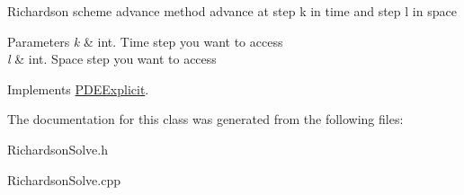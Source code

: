 Richardson scheme advance method advance at step k in time and step l in space 
\begin{DoxyParams}{Parameters}
{\em k} & int. Time step you want to access \\
\hline
{\em l} & int. Space step you want to access \\
\hline
\end{DoxyParams}


Implements \hyperlink{class_p_d_e_explicit_aed238f52510878474c02681904013dd3}{P\+D\+E\+Explicit}.



The documentation for this class was generated from the following files\+:\begin{DoxyCompactItemize}
\item 
Richardson\+Solve.\+h\item 
Richardson\+Solve.\+cpp\end{DoxyCompactItemize}
